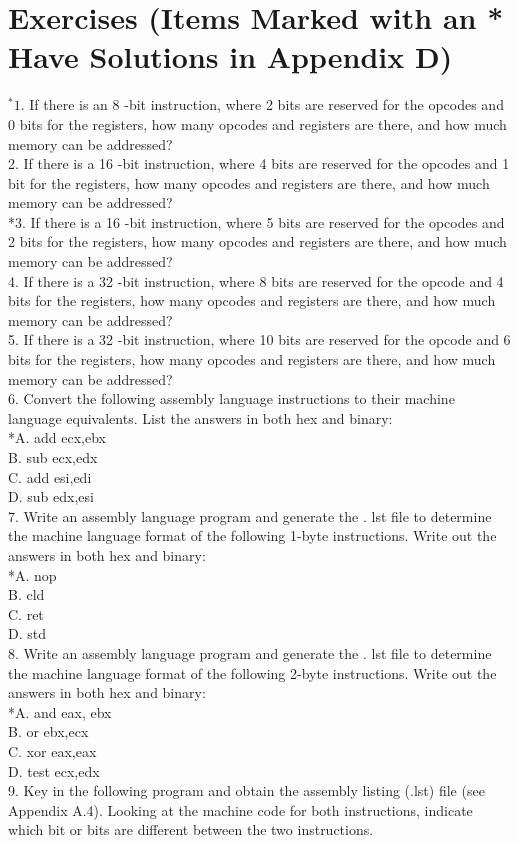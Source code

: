 \documentclass[10pt]{book}
\begin{document}
\section{Exercises (Items Marked with an * Have Solutions in Appendix D)}
${ }^{*} 1$. If there is an 8 -bit instruction, where 2 bits are reserved for the opcodes and 0 bits for the registers, how many opcodes and registers are there, and how much memory can be addressed?\\
2. If there is a 16 -bit instruction, where 4 bits are reserved for the opcodes and 1 bit for the registers, how many opcodes and registers are there, and how much memory can be addressed?\\
*3. If there is a 16 -bit instruction, where 5 bits are reserved for the opcodes and 2 bits for the registers, how many opcodes and registers are there, and how much memory can be addressed?\\
4. If there is a 32 -bit instruction, where 8 bits are reserved for the opcode and 4 bits for the registers, how many opcodes and registers are there, and how much memory can be addressed?\\
5. If there is a 32 -bit instruction, where 10 bits are reserved for the opcode and 6 bits for the registers, how many opcodes and registers are there, and how much memory can be addressed?\\
6. Convert the following assembly language instructions to their machine language equivalents. List the answers in both hex and binary:\\
*A. add ecx,ebx\\
B. sub ecx,edx\\
C. add esi,edi\\
D. sub edx,esi\\
7. Write an assembly language program and generate the . lst file to determine the machine language format of the following 1-byte instructions. Write out the answers in both hex and binary:\\
*A. nop\\
B. cld\\
C. ret\\
D. std\\
8. Write an assembly language program and generate the . lst file to determine the machine language format of the following 2-byte instructions. Write out the answers in both hex and binary:\\
*A. and eax, ebx\\
B. or ebx,ecx\\
C. xor eax,eax\\
D. test ecx,edx\\
9. Key in the following program and obtain the assembly listing (.lst) file (see Appendix A.4). Looking at the machine code for both instructions, indicate which bit or bits are different between the two instructions.
\end{document}
